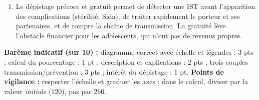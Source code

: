 \documentclass[11pt]{article}
\begin{document}
\begin{corrige}
\begin{enumerate}
\item Le dépistage précoce et gratuit permet de détecter une IST avant l'apparition des complications (stérilité, Sida), de traiter rapidement le porteur et ses partenaires, et de rompre la chaîne de transmission. La gratuité lève l'obstacle financier pour les adolescents, qui n'ont pas de revenus propres.
\end{enumerate}
\textbf{Barème indicatif (sur 10) :} diagramme correct avec échelle et légendes : 3 pts ; calcul du pourcentage : 1 pt ; description et explications : 2 pts ; trois couples transmission/prévention : 3 pts ; intérêt du dépistage : 1 pt.
\textbf{Points de vigilance :} respecter l'échelle et graduer les axes ; dans le calcul, diviser par la valeur \emph{initiale} (120), pas par 260.
\end{corrige}
\end{document}
